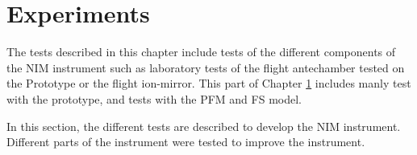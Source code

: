 \section{Experiments} \label{sec:Exp}
	The tests described in this chapter include tests of the different components of the NIM instrument such as laboratory tests of the flight antechamber tested on the Prototype or the flight ion-mirror. This part of Chapter \ref{sec:Exp} includes manly test with the prototype, and tests with the PFM and FS model.




	In this section, the different tests are described to develop the NIM instrument. Different parts of the instrument were tested to improve the instrument.

